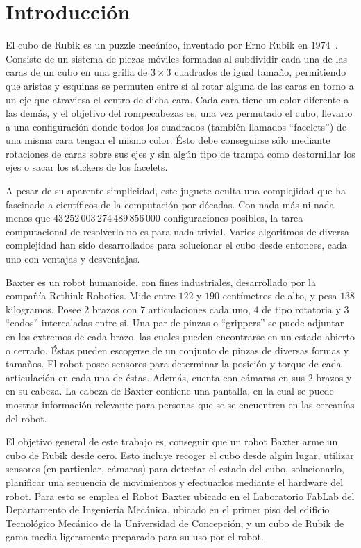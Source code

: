 \chapter{Introducción}

El cubo de Rubik es un puzzle mecánico, inventado por Erno Rubik en $1974$~\cite{ernorubik1974}. Consiste de un sistema de piezas móviles formadas al subdividir cada una de las caras de un cubo en una grilla de $3\times 3$ cuadrados de igual tamaño, permitiendo que aristas y esquinas se permuten entre sí al rotar alguna de las caras en torno a un eje que atraviesa el centro de dicha cara. Cada cara tiene un color diferente a las demás, y el objetivo del rompecabezas es, una vez permutado el cubo, llevarlo a una configuración donde todos los cuadrados (también llamados ``facelets'') de una misma cara tengan el mismo color. Ésto debe conseguirse sólo mediante rotaciones de caras sobre sus ejes y sin algún tipo de trampa como destornillar los ejes o sacar los stickers de los facelets.

A pesar de su aparente simplicidad, este juguete oculta una complejidad que ha fascinado a científicos de la computación por décadas. Con nada más ni nada menos que $43\,252\,003\,274\,489\,856\,000$ configuraciones posibles\cite{mathematicsrubik}\cite{mathematicsrubik2}, la tarea computacional de resolverlo no es para nada trivial. Varios algoritmos de diversa complejidad han sido desarrollados para solucionar el cubo desde entonces, cada uno con ventajas y desventajas.

Baxter es un robot humanoide, con fines industriales, desarrollado por la compañía Rethink Robotics\cite{baxterproduct}. Mide entre $122$ y $190$ centímetros de alto, y pesa $138$ kilogramos. Posee $2$ brazos con $7$ articulaciones cada uno, $4$ de tipo rotatoria y $3$ ``codos'' intercaladas entre si. Una par de pinzas o ``grippers'' se puede adjuntar en los extremos de cada brazo, las cuales pueden encontrarse en un estado abierto o cerrado. Éstas pueden escogerse de un conjunto de pinzas de diversas formas y tamaños. El robot posee sensores para determinar la posición y torque de cada articulación en cada una de éstas. Además, cuenta con cámaras en sus $2$ brazos y en su cabeza. La cabeza de Baxter contiene una pantalla, en la cual se puede mostrar información relevante para personas que se se encuentren en las cercanías del robot\cite{baxterspecs}.


El objetivo general de este trabajo es, conseguir que un robot Baxter arme un cubo de Rubik desde cero. Esto incluye recoger el cubo desde algún lugar, utilizar sensores (en particular, cámaras) para detectar el estado del cubo, solucionarlo, planificar una secuencia de movimientos y efectuarlos mediante el hardware del robot. Para esto se emplea el Robot Baxter ubicado en el Laboratorio FabLab del Departamento de Ingeniería Mecánica, ubicado en el primer piso del edificio Tecnológico Mecánico de la Universidad de Concepción, y un cubo de Rubik de gama media ligeramente preparado para su uso por el robot.

